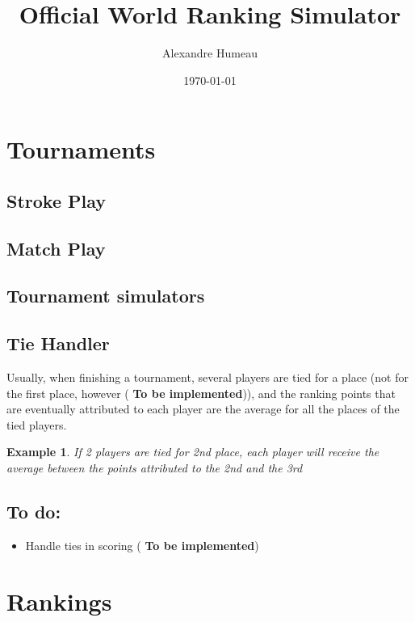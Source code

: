 \documentclass{article}
\newtheorem{example}{Example}[section]
\begin{document}
\title{Official World Ranking Simulator}
\author{Alexandre Humeau}
\date{\today}
\maketitle
\clearpage

\tableofcontents
\clearpage

\section{Tournaments}
\subsection{Stroke Play}
\subsection{Match Play}
\subsection{Tournament simulators}

\subsection{Tie Handler}
Usually, when finishing a tournament, several players are tied for a place (not for the first place, however (\textbf{\color{orange} To be implemented})), and the ranking points that are eventually attributed to each player are the average for all the places of the tied players.

\begin{example}
	If 2 players are tied for 2nd place, each player will receive the average between the points attributed to the 2nd and the 3rd
\end{example}

\subsection{To do:}
\begin{itemize}
	\item Handle ties in scoring (\textbf{\color{orange} To be implemented})
\end{itemize}

\clearpage

\section{Rankings}
\end{document}
